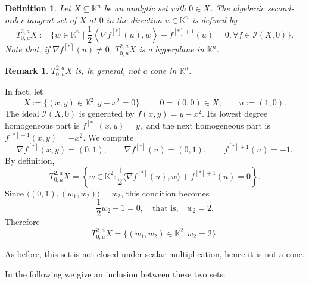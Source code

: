 \documentclass[10pt,reqno]{amsart}
\theoremstyle{break-italic}
\theoremstyle{break-italic}
\theoremstyle{break-italic}
\theoremstyle{break-italic}
\theoremstyle{break-italic}
\theoremstyle{break-italic}
\theoremstyle{break-italic}
\theoremstyle{break-italic}
\theoremstyle{break-roman}
\newtheorem{definition}[satz]{Definition}
\newtheorem{remark}[satz]{Remark}
\theoremstyle{standard}
\theoremstyle{varthm-roman}
\theoremstyle{varthm-italic}
\theoremstyle{varthm-roman-break}
\theoremstyle{varthm-italic-break}
\theoremstyle{varthm-roman-no-punctuation}
\theoremstyle{varthm-italic-no-punctuation}
\numberwithin{equation}{section}
\def\df{\begin{definition}}
\def\edf{\end{definition}}
\newcommand{\seq}[1]{\left<#1\right>}
\begin{document}
 
\df \label{def:algebraic-tangent-set}\rm Let $X\subseteq \mathbb K^n$ be an analytic set with  $0 \in X$. The \textit{algebraic second-order tangent set} of $X$ at $0$ \textit{in the direction} $u\in \mathbb K^n$ is defined by 
$$T^{2,a}_{0,u} X:=\Big\{w\in \mathbb K^n \mid \dfrac{1}{2}\seq{\nabla f^{[*]}(u),w} + f^{[*]+1}(u) = 0, \forall f \in \mathcal{I}(X,0)\Big\}.$$ 
Note that, if  $\nabla f^{[*]}(u) \not = 0$, $T^{2,a}_{0,u} X$ is a  hyperplane  in $\mathbb K^n$. 
\edf 

\begin{remark} \rm $T^{2,a}_{0,u}X$ is, in general, not a cone in $\mathbb K^n$. 
\end{remark}
In fact,  let 
\[
X:=\{(x,y)\in \mathbb K^2 : y-x^2=0\},
\qquad 0=(0,0)\in X,
\qquad u:=(1,0).
\]
The ideal $\mathcal{I}(X,0)$ is generated by
\(
f(x,y)=y-x^2.
\)
Its lowest degree homogeneous part is
\(
f^{[*]}(x,y)=y,
\)
and the next homogeneous part is
\(
f^{[*]+1}(x,y)=-x^2.
\)
We compute
\[
\nabla f^{[*]}(x,y)=(0,1),
\qquad
\nabla f^{[*]}(u)=(0,1),
\qquad
f^{[*]+1}(u)=-1.
\]
By definition,
\[
T^{2,a}_{0,u}X
=
\left\{
w\in\mathbb K^2 :
\frac12\langle \nabla f^{[*]}(u),w\rangle + f^{[*]+1}(u)=0
\right\}.
\]
Since $\langle (0,1),(w_1,w_2)\rangle=w_2$, this condition becomes
\[
\frac12 w_2 -1=0,
\quad\text{that is,}\quad
w_2=2.
\]
Therefore
\[
T^{2,a}_{0,u}X=\{(w_1,w_2)\in\mathbb K^2 : w_2=2\}.
\]

As before, this set is not closed under scalar multiplication, hence it is not a cone.


In the following we give an inclusion between these two sets.
\end{document}
